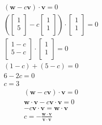 \documentclass{report}
\begin{document}
\begin{question}{12}{}
    \begin{gather*}
        (\mathbf{w} - c \mathbf{v}) \cdot \mathbf{v} = 0 \\
        (
        \begin{bmatrix}
        1\\
        5\\
        \end{bmatrix}
        - c 
        \begin{bmatrix}
        1\\
        1\\
        \end{bmatrix}) 
        \cdot
        \begin{bmatrix}
        1\\
        1\\
        \end{bmatrix}
        = 0 \\
        \begin{bmatrix}
        1 - c\\
        5 - c\\
        \end{bmatrix}
        \cdot
        \begin{bmatrix}
        1\\
        1\\
        \end{bmatrix}
        = 0 \\
        (1 - c) + (5 - c) = 0 \\
        6 - 2c = 0 \\
        c = 3
    \end{gather*}
    \begin{gather*}
        (\mathbf{w} - c \mathbf{v}) \cdot \mathbf{v} = 0 \\
        \mathbf{w} \cdot \mathbf{v} - c \mathbf{v} \cdot \mathbf{v} = 0 \\
         - c \mathbf{v} \cdot \mathbf{v} = \mathbf{w} \cdot \mathbf{v}   \\
         c = - \frac{\mathbf{w} \cdot \mathbf{v}}{\mathbf{v} \cdot \mathbf{v}}   \\
    \end{gather*}
\end{question}
\end{document}
